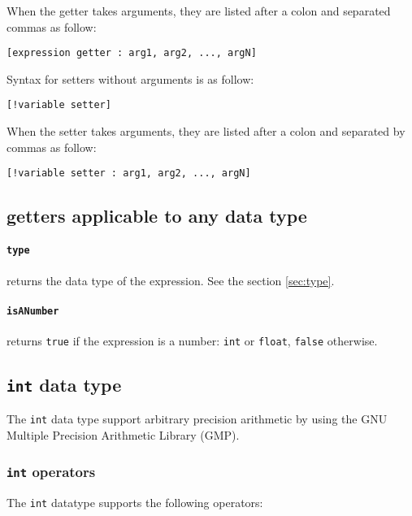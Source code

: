 \documentclass[11pt]{article}
\begin{document}
When the getter takes arguments, they are listed after a colon and separated commas as follow:

\begin{lstlisting}[language=goilTemplate]
[expression getter : arg1, arg2, ..., argN]
\end{lstlisting}

Syntax for setters without arguments is as follow:

\begin{lstlisting}[language=goilTemplate]
[!variable setter]
\end{lstlisting}

When the setter takes arguments, they are listed after a colon and separated by commas as follow:

\begin{lstlisting}[language=goilTemplate]
[!variable setter : arg1, arg2, ..., argN]
\end{lstlisting}

\subsection{getters applicable to any data type}

\paragraph{\lstinline{type}} returns the data type of the expression. See the section \ref{sec:type}.

\paragraph{\lstinline{isANumber}} returns \lstinline{true} if the expression is a number: \lstinline{int} or \lstinline{float}, \lstinline{false} otherwise.

\subsection{\lstinline{int} data type}

The \lstinline{int} data type support arbitrary precision arithmetic by using the GNU Multiple Precision Arithmetic Library (GMP).

\subsubsection{\lstinline{int} operators}

The \lstinline{int} datatype supports the following operators:
\end{document}
